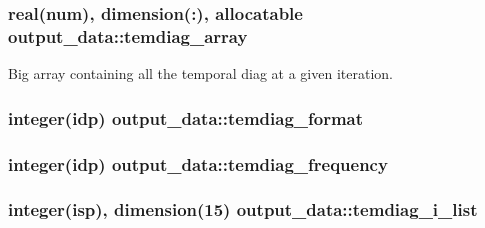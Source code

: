 \subsubsection[{\texorpdfstring{temdiag\+\_\+array}{temdiag_array}}]{\setlength{\rightskip}{0pt plus 5cm}real(num), dimension(\+:), allocatable output\+\_\+data\+::temdiag\+\_\+array}\hypertarget{namespaceoutput__data_a034b19d2c3a5211b1fd96df24cd28dd1}{}\label{namespaceoutput__data_a034b19d2c3a5211b1fd96df24cd28dd1}


Big array containing all the temporal diag at a given iteration. 

\subsubsection[{\texorpdfstring{temdiag\+\_\+format}{temdiag_format}}]{\setlength{\rightskip}{0pt plus 5cm}integer(idp) output\+\_\+data\+::temdiag\+\_\+format}\hypertarget{namespaceoutput__data_a2f4ce5fdd4011f5db5c6b9de97cf133a}{}\label{namespaceoutput__data_a2f4ce5fdd4011f5db5c6b9de97cf133a}
\subsubsection[{\texorpdfstring{temdiag\+\_\+frequency}{temdiag_frequency}}]{\setlength{\rightskip}{0pt plus 5cm}integer(idp) output\+\_\+data\+::temdiag\+\_\+frequency}\hypertarget{namespaceoutput__data_ab55f479db67f7b4af32d0a55e2ba6620}{}\label{namespaceoutput__data_ab55f479db67f7b4af32d0a55e2ba6620}
\subsubsection[{\texorpdfstring{temdiag\+\_\+i\+\_\+list}{temdiag_i_list}}]{\setlength{\rightskip}{0pt plus 5cm}integer(isp), dimension(15) output\+\_\+data\+::temdiag\+\_\+i\+\_\+list}\hypertarget{namespaceoutput__data_a9cf412af092dd4e6d2877134a66b665d}{}\label{namespaceoutput__data_a9cf412af092dd4e6d2877134a66b665d}


